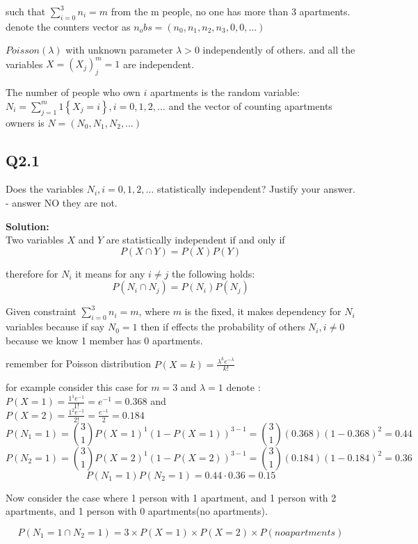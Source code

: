 such that $\sum_{i=0}^{3} n_i = m $ from the m people, no one has more than 3 apartments.
denote the counters vector as $n_obs=(n_0,n_1,n_2,n_3,0,0,\dots)$

$Poisson(\lambda)$ with unknown parameter $\lambda > 0$ independently of others.
and all the variables $X=(X_j)^m_j=1$ are independent.

The number of people who own $i$ apartments is the random variable:
$N_i=\sum_{j=1}^{m} 1\left\{X_j=i\right\}, i=0,1,2,\dots$
and the vector of counting apartments owners is $N=(N_0,N_1,N_2,\dots)$

\subsection{Q2.1}
Does the variables $N_i , i=0,1,2,\dots$ statistically independent?
Justify your answer. - answer NO they are not.

\textbf{Solution:} \\
Two variables $X$ and $Y$ are statistically independent if and only if
\[P(X \cap Y) = P(X)P(Y)\]

therefore for $N_i$ it means for any $i \neq j$ the following holds:
\[P(N_i \cap N_j) = P(N_i)P(N_j)\]

Given constraint $\sum_{i=0}^{3} n_i = m$, where $m$ is the fixed,
it makes dependency for $N_i$ variables because if say $N_0=1$ then
if effects the probability of others $N_i, i\neq 0 $ because 
we know 1 member has 0 apartments. 

remember for Poisson distribution $P(X=k)=\frac{\lambda^k e^{-\lambda}}{k!}$

for example consider this case for $m=3$ and $\lambda=1$
denote : \\
 $P(X=1)=\frac{1^1 e^{-1}}{1!}=e^{-1}=0.368$
 and \\
 
 $P(X=2)=\frac{1^2 e^{-1}}{2!}=\frac{e^{-1}}{2}=0.184$
\[ 
    P(N_1=1)= \binom{3}{1} P(X=1)^1(1-P(X=1))^{3-1}= \binom{3}{1}  (0.368)  (1-0.368)^2 = 0.44
\]
\[ 
    P(N_2=1)= \binom{3}{1} P(X=2)^1(1-P(X=2))^{3-1} =\binom{3}{1} (0.184)  (1-0.184)^2 =  0.36
\]
\[
    P(N_1=1)P(N_2=1) = 0.44 \cdot 0.36 = 0.15
\]

Now consider the case where 1 person with 1 apartment, and 1 person with 2 apartments, and 1 person
with 0 apartments(no apartments).

\[
    P(N_1 = 1 \cap N_2 = 1) = 3 \times P(X=1)\times P(X=2) \times P(no apartments)   
\]

